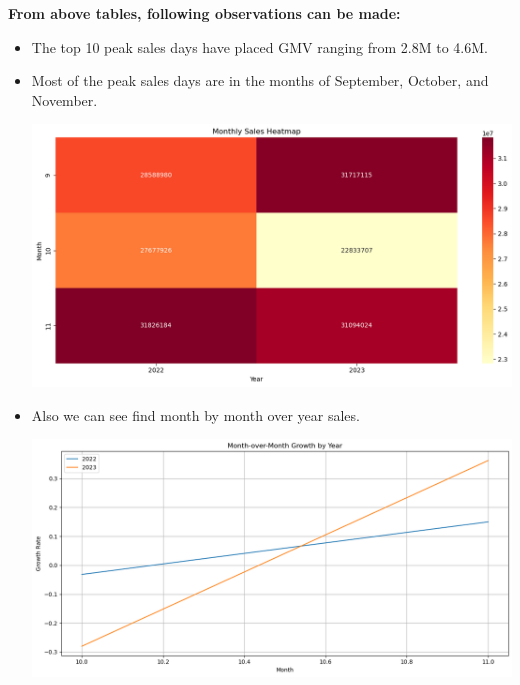 \documentclass{article}
\begin{document}
\textbf{From above tables, following observations can be made:}

\begin{itemize}
    \item The top 10 peak sales days have placed GMV ranging from 2.8M to 4.6M.
    \item Most of the peak sales days are in the months of September, October, and November.{
        \begin{center}
            \includegraphics[width=1\columnwidth]{images/month.png}
        \end{center}
    }
    \item Also we can see find month by month over year sales.{
        \begin{center}
            \includegraphics[width=1\columnwidth]{images/month-growth.png}
        \end{center}
    }
\end{itemize}
\end{document}
